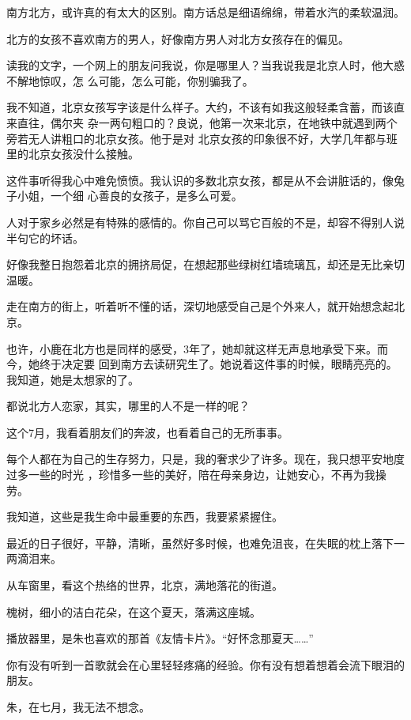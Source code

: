 \documentclass[12pt,a4paper]{article}
\begin{document}
		南方北方，或许真的有太大的区别。南方话总是细语绵绵，带着水汽的柔软温润。

		北方的女孩不喜欢南方的男人，好像南方男人对北方女孩存在的偏见。

		读我的文字，一个网上的朋友问我说，你是哪里人？当我说我是北京人时，他大惑不解地惊叹，怎
	么可能，怎么可能，你别骗我了。

		我不知道，北京女孩写字该是什么样子。大约，不该有如我这般轻柔含蓄，而该直来直往，偶尔夹
	杂一两句粗口的？良说，他第一次来北京，在地铁中就遇到两个旁若无人讲粗口的北京女孩。他于是对
	北京女孩的印象很不好，大学几年都与班里的北京女孩没什么接触。

		这件事听得我心中难免愤愤。我认识的多数北京女孩，都是从不会讲脏话的，像兔子小姐，一个细
	心善良的女孩子，是多么可爱。

		人对于家乡必然是有特殊的感情的。你自己可以骂它百般的不是，却容不得别人说半句它的坏话。

		好像我整日抱怨着北京的拥挤局促，在想起那些绿树红墙琉璃瓦，却还是无比亲切温暖。

		走在南方的街上，听着听不懂的话，深切地感受自己是个外来人，就开始想念起北京。

		也许，小鹿在北方也是同样的感受，3年了，她却就这样无声息地承受下来。而今，她终于决定要
	回到南方去读研究生了。她说着这件事的时候，眼睛亮亮的。我知道，她是太想家的了。

		都说北方人恋家，其实，哪里的人不是一样的呢？

		这个7月，我看着朋友们的奔波，也看着自己的无所事事。

		每个人都在为自己的生存努力，只是，我的奢求少了许多。现在，我只想平安地度过多一些的时光
	，珍惜多一些的美好，陪在母亲身边，让她安心，不再为我操劳。

		我知道，这些是我生命中最重要的东西，我要紧紧握住。

		最近的日子很好，平静，清晰，虽然好多时候，也难免沮丧，在失眠的枕上落下一两滴泪来。

	\endwriting



		从车窗里，看这个热络的世界，北京，满地落花的街道。

		槐树，细小的洁白花朵，在这个夏天，落满这座城。

		播放器里，是朱也喜欢的那首《友情卡片》。“好怀念那夏天……”

		你有没有听到一首歌就会在心里轻轻疼痛的经验。你有没有想着想着会流下眼泪的朋友。

		朱，在七月，我无法不想念。
\end{document}
